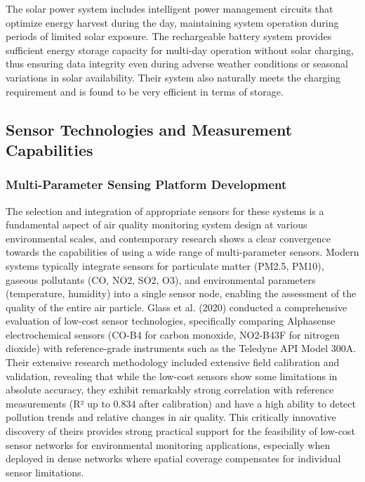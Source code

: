 \documentclass[conference]{IEEEtran}
\begin{document}
The solar power system includes intelligent power management circuits that optimize energy harvest during the day, maintaining system operation during periods of limited solar exposure. The rechargeable battery system provides sufficient energy storage capacity for multi-day operation without solar charging, thus ensuring data integrity even during adverse weather conditions or seasonal variations in solar availability. Their system also naturally meets the charging requirement and is found to be very efficient in terms of storage.~\cite{sulimat2024}

\subsection{Sensor Technologies and Measurement Capabilities}
\subsubsection{Multi-Parameter Sensing Platform Development}
The selection and integration of appropriate sensors for these systems is a fundamental aspect of air quality monitoring system design at various environmental scales, and contemporary research shows a clear convergence towards the capabilities of using a wide range of multi-parameter sensors. Modern systems typically integrate sensors for particulate matter (PM2.5, PM10), gaseous pollutants (CO, NO2, SO2, O3), and environmental parameters (temperature, humidity) into a single sensor node, enabling the assessment of the quality of the entire air particle. Glass et al. (2020) conducted a comprehensive evaluation of low-cost sensor technologies, specifically comparing Alphasense electrochemical sensors (CO-B4 for carbon monoxide, NO2-B43F for nitrogen dioxide) with reference-grade instruments such as the Teledyne API Model 300A. Their extensive research methodology included extensive field calibration and validation, revealing that while the low-cost sensors show some limitations in absolute accuracy, they exhibit remarkably strong correlation with reference measurements (R² up to 0.834 after calibration) and have a high ability to detect pollution trends and relative changes in air quality. This critically innovative discovery of theirs provides strong practical support for the feasibility of low-cost sensor networks for environmental monitoring applications, especially when deployed in dense networks where spatial coverage compensates for individual sensor limitations.~\cite{glass2020}
\end{document}
